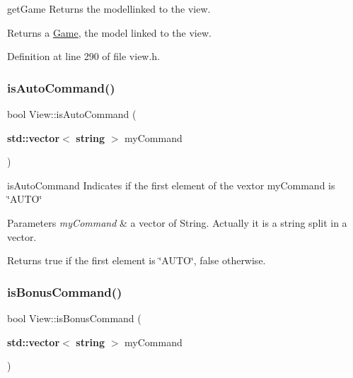 get\+Game Returns the modellinked to the view. 

\begin{DoxyReturn}{Returns}
a \hyperlink{class_game}{Game}, the model linked to the view. 
\end{DoxyReturn}


Definition at line 290 of file view.\+h.

\mbox{\label{class_view_aabe180bf6a2b9b597fb49107f609215a}} 
\subsubsection{\texorpdfstring{is\+Auto\+Command()}{isAutoCommand()}}
{\footnotesize\ttfamily bool View\+::is\+Auto\+Command (\begin{DoxyParamCaption}\item[{\textbf{ std\+::vector}$<$ \textbf{ string} $>$}]{my\+Command }\end{DoxyParamCaption})}



is\+Auto\+Command Indicates if the first element of the vextor my\+Command is \char`\"{}\+A\+U\+T\+O\char`\"{} 


\begin{DoxyParams}{Parameters}
{\em my\+Command} & a vector of String. Actually it is a string split in a vector. \\
\hline
\end{DoxyParams}
\begin{DoxyReturn}{Returns}
true if the first element is \char`\"{}\+A\+U\+T\+O\char`\"{}, false otherwise. 
\end{DoxyReturn}
\mbox{\label{class_view_a203e416b63702c5278f471508a8b60e8}} 
\subsubsection{\texorpdfstring{is\+Bonus\+Command()}{isBonusCommand()}}
{\footnotesize\ttfamily bool View\+::is\+Bonus\+Command (\begin{DoxyParamCaption}\item[{\textbf{ std\+::vector}$<$ \textbf{ string} $>$}]{my\+Command }\end{DoxyParamCaption})}



